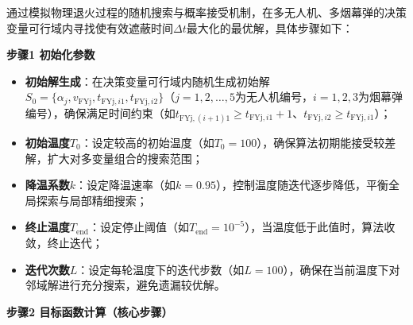 \documentclass[../main.tex]{subfiles}
\begin{document}

通过模拟物理退火过程的随机搜索与概率接受机制，在多无人机、多烟幕弹的决策变量可行域内寻找使有效遮蔽时间$\Delta t$最大化的最优解，具体步骤如下：

\noindent\textbf{步骤1 初始化参数}
\begin{itemize}
    \item \textbf{初始解生成}：在决策变量可行域内随机生成初始解$S_0=\{\alpha_j, v_{\text{FYj}}, t_{\text{FYj},i1}, t_{\text{FYj},i2}\}$（$j=1,2,\dots,5$为无人机编号，$i=1,2,3$为烟幕弹编号），确保满足时间约束（如$t_{\text{FYj},(i+1)1} \geq t_{\text{FYj},i1}+1$、$t_{\text{FYj},i2} \geq t_{\text{FYj},i1}$）；
    \item \textbf{初始温度$T_0$}：设定较高的初始温度（如$T_0=100$），确保算法初期能接受较差解，扩大对多变量组合的搜索范围；
    \item \textbf{降温系数$k$}：设定降温速率（如$k=0.95$），控制温度随迭代逐步降低，平衡全局探索与局部精细搜索；
    \item \textbf{终止温度$T_{\text{end}}$}：设定停止阈值（如$T_{\text{end}}=10^{-5}$），当温度低于此值时，算法收敛，终止迭代；
    \item \textbf{迭代次数$L$}：设定每轮温度下的迭代步数（如$L=100$），确保在当前温度下对邻域解进行充分搜索，避免遗漏较优解。
\end{itemize}

\noindent\textbf{步骤2 目标函数计算（核心步骤）}
\end{document}
